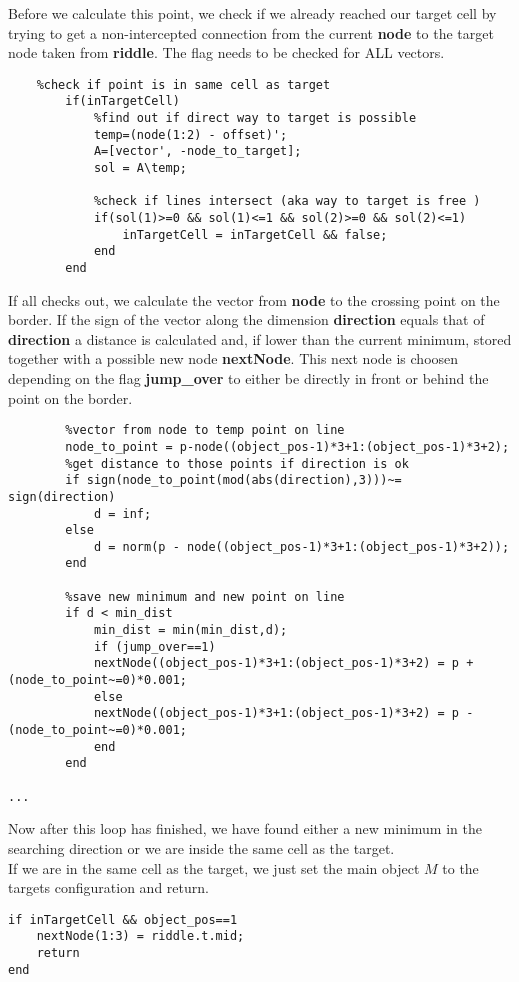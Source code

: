 Before we calculate this point, we check if we already reached our target cell by trying to get a non-intercepted connection from the current \textbf{node} to the target node taken from \textbf{riddle}. The flag needs to be checked for ALL vectors.       
\begin{lstlisting}
    %check if point is in same cell as target
        if(inTargetCell)
            %find out if direct way to target is possible
            temp=(node(1:2) - offset)';
            A=[vector', -node_to_target];
            sol = A\temp;
            
            %check if lines intersect (aka way to target is free )
            if(sol(1)>=0 && sol(1)<=1 && sol(2)>=0 && sol(2)<=1)
                inTargetCell = inTargetCell && false;
            end    
        end
\end{lstlisting}
If all checks out, we calculate the vector from \textbf{node} to the crossing point on the border. If the sign of the vector along the dimension \textbf{direction} equals that of \textbf{direction} a distance is calculated and, if lower than the current minimum, stored together with a possible new node \textbf{nextNode}.
This next node is choosen depending on the flag \textbf{jump\_over} to either be directly in front or behind the point on the border.
\begin{lstlisting}
        %vector from node to temp point on line
        node_to_point = p-node((object_pos-1)*3+1:(object_pos-1)*3+2);
        %get distance to those points if direction is ok
        if sign(node_to_point(mod(abs(direction),3)))~= sign(direction)
            d = inf;
        else
            d = norm(p - node((object_pos-1)*3+1:(object_pos-1)*3+2));
        end
        
        %save new minimum and new point on line
        if d < min_dist
            min_dist = min(min_dist,d);
            if (jump_over==1)
            nextNode((object_pos-1)*3+1:(object_pos-1)*3+2) = p + (node_to_point~=0)*0.001;
            else
            nextNode((object_pos-1)*3+1:(object_pos-1)*3+2) = p - (node_to_point~=0)*0.001;
            end
        end
        
...
\end{lstlisting}
Now after this loop has finished, we have found either a new minimum in the searching direction or we are inside the same cell as the target. \\
If we are in the same cell as the target, we just set the main object $M$ to the targets configuration and return.
\begin{lstlisting}
if inTargetCell && object_pos==1
    nextNode(1:3) = riddle.t.mid;
    return
end
\end{lstlisting}
